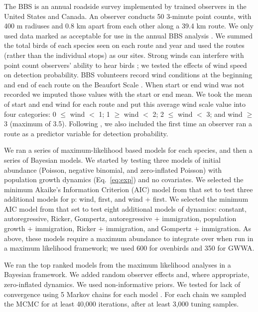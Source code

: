 \documentclass[12pt]{article}
\begin{document}
The BBS is an annual roadside survey implemented by trained observers
in the United States and Canada. An observer conducts 50 3-minute point counts,
with 400 m radiuses and 0.8 km apart from each other along a 39.4 km route.
We only used data marked as acceptable for use in the annual BBS analysis
\citep{sauer_etal:1994auk}.  We summed the total birds of each
species seen on each route and year and used the routes (rather than
the individual stops) as our sites.
Strong winds can interfere with point count observers' ability to hear
birds \citep{simons_etal:2007}; we tested the effects of wind speed
on detection probability.  BBS volunteers record wind conditions at
the beginning and end of each route on the Beaufort Scale
\citep[start and end wind 0-9]{robbins_etal:1986}.
When
start or end wind was not recorded we imputed those values with the
start or end mean.  We took the mean of start and end wind for each
route and put this average wind scale value into four categories: 0 $\leq$
wind $<$ 1; 1 $\geq$ wind $<$ 2; 2 $\leq$ wind $<$ 3; and wind $\geq$ 3 (maximum of 3.5).
Following \citet{link_sauer:2002},
we also included the first time an
observer ran a route as a predictor variable for detection
probability.

We ran a series of maximum-likelihood based models for each species,
and then a series of Bayesian models.  We started by testing three
models of initial abundance (Poisson, negative binomial, and
zero-inflated Poisson) with population growth dynamics (Eq.~\ref{eq:exp})
and no covariates.  We selected the minimum Akaike's Information
Criterion (AIC) model from that set to test three additional models
for p: wind, first, and wind + first.   We selected the minimum AIC
model from that set to test eight additional models of dynamics:
constant, autoregressive, Ricker, Gompertz, autoregressive +
immigration, population growth + immigration, Ricker + immigration,
and Gompertz + immigration.  %
As above, these models require a maximum abundance to integrate over
when run in a maximum likelihood
framework; we used 600 for ovenbirds and 350
for GWWA.

We ran the top ranked models from the maximum likelihood analyses in a
Bayesian framework.  We added random observer effects and, where
appropriate, zero-inflated dynamics.  We used
non-informative priors.  We tested for lack of convergence using 5
Markov chains for each model \citep{gelman_rubin:1992}.
For each chain
we sampled the MCMC for at least 40,000 iterations, after at least 3,000 tuning samples.
\end{document}
